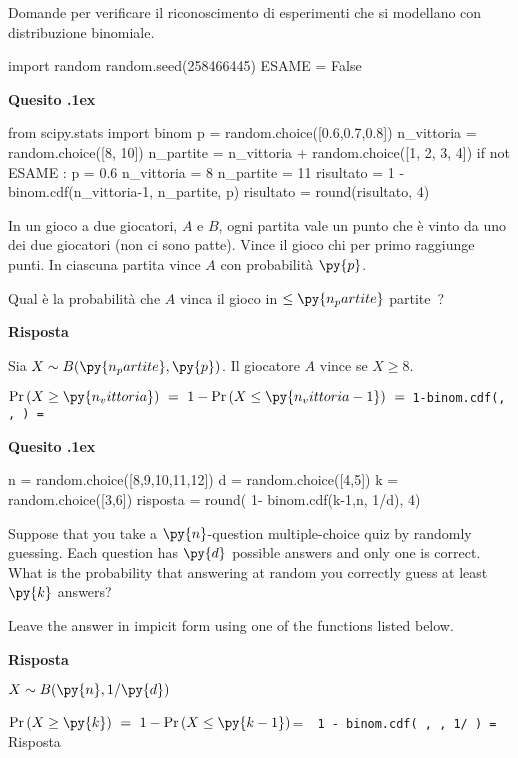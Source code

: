 \documentclass[11pt,twoside,a4paper]{article}
\newcounter{quesito}
\newenvironment{question}{\bigskip\addtocounter{quesito}{1}\bigskip\bigskip\par\textbf{Quesito \thequesito.\kern1ex}}{\vspace{\parskip}}
\newenvironment{answer}{\par\textbf{Risposta\quad}}{\vspace{\parskip}}
\begin{document}
\colorbox{blue!10}{\begin{minipage}{\textwidth}
Domande  per verificare il riconoscimento di esperimenti che si modellano con distribuzione binomiale.
\end{minipage}}

\bigskip\bigskip


\begin{pycode}
import random
random.seed(258466445)
ESAME = False
\end{pycode}


\begin{question}
\def\Pr{{\rm Pr\,}}
\def\Ex{{\rm E\,}}
\def\Var{{\rm Var\,}}
\begin{pycode}
from scipy.stats import binom
p = random.choice([0.6,0.7,0.8])
n_vittoria = random.choice([8, 10])
n_partite = n_vittoria + random.choice([1, 2, 3, 4])
if not ESAME :
   p = 0.6
   n_vittoria = 8
   n_partite = 11
risultato = 1 - binom.cdf(n_vittoria-1, n_partite, p)
risultato = round(risultato, 4)
\end{pycode}
In un gioco a due giocatori, $A$ e $B$, ogni partita vale un punto che è vinto da uno dei due giocatori (non ci sono patte). Vince il gioco chi per primo raggiunge  punti. In ciascuna partita vince $A$ con probabilità $\py{p}$.

Qual è la probabilità che $A$ vinca il gioco in $\le\py{n_partite}$ partite~?
\begin{answer}

Sia $X\sim B(\py{n_partite},\py{p})$. Il giocatore $A$ vince se $X\ge 8$. 

$\displaystyle\Pr(X\ge\py{n_vittoria})\ =\ 1-\Pr( X\le\py{n_vittoria-1} )\ =\ ${\tt\color{blue}1-binom.cdf(, , ) = }{\tt{} }
\end{answer}
\end{question}



\begin{question}
\begin{pycode}
n = random.choice([8,9,10,11,12])
d = random.choice([4,5])
k = random.choice([3,6])
risposta = round( 1- binom.cdf(k-1,n, 1/d), 4)
\end{pycode}
Suppose that you take a $\py{n}$-question multiple-choice quiz by randomly guessing. Each question has $\py{d}$ possible answers and only one is correct. What is the probability that answering at random you correctly guess at least $\py{k}$ answers? 

Leave the answer in impicit form using one of the functions listed below.
\begin{answer}

$X\sim B(\py{n}, 1/\py{d})$

$\Pr(X\ge\py{k})\ =\ 1-\Pr(X\le \py{k-1})$\quad =\ {\tt{\color{blue}  1 - binom.cdf( , , 1/ )} = }{\color{blue}\hfill Risposta}

\end{answer}
\end{question}
\end{document}
